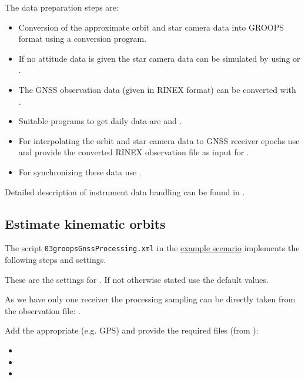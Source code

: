 The data preparation steps are:
\begin{itemize}
  \item Conversion of the approximate orbit and star camera data into GROOPS format using a conversion program.
  \item If no attitude data is given the star camera data can be simulated by using  or .
  \item The GNSS observation data (given in RINEX format) can be converted with .
  \item Suitable programs to get daily data are  and .
  \item For interpolating the orbit and star camera data to GNSS receiver epochs use  and provide the converted RINEX observation file as input for
  .
  \item For synchronizing these data use .
\end{itemize}
Detailed description of instrument data handling can be found in .

\subsection{Estimate kinematic orbits}\label{cookbook.kinematicOrbit:processing}
The script \verb|03groopsGnssProcessing.xml| in the \href{https://ftp.tugraz.at/outgoing/ITSG/groops/scenario/scenarioLeoKinematicOrbit.zip}{example scenario}
implements the following steps and settings.

These are the settings for . If not otherwise stated use the default values.

As we have only one receiver the processing sampling can be directly taken from the observation file:
.

Add the appropriate  (e.g. GPS)
and provide the required files (from ):
\begin{itemize}
  \item {}
  \item {}
  \item {}
\end{itemize}

